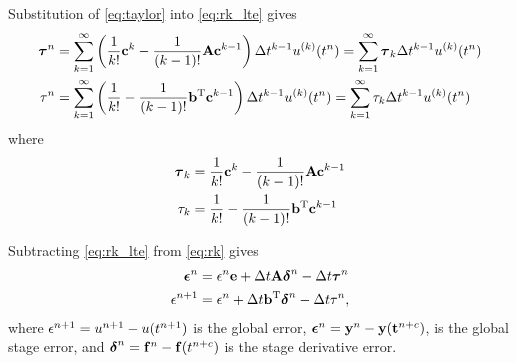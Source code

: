 Substitution of \eqref{eq:taylor} into \eqref{eq:rk_lte} gives
\begin{subequations} \label{eq:ste}
\begin{align}
\boldsymbol{\tau}^n & = \sum_{k=1}^\infty \left( \frac{1}{k!} \mathbf{c}^k - \frac{1}{(k-1)!} \mathbf{A} \mathbf{c}^{k-1}\right) \Delta t^{k-1} u^{(k)}(t^{n}) = \sum_{k=1}^\infty \boldsymbol{\tau}_k \Delta t^{k-1} u^{(k)}(t^{n}) \\
\tau^n & = \sum_{k=1}^\infty \left( \frac{1}{k!} - \frac{1}{(k-1)!} \mathbf{b}^\mathrm{T} \mathbf{c}^{k-1}\right) \Delta t^{k-1} u^{(k)}(t^{n}) = \sum_{k=1}^\infty \tau_k \Delta t^{k-1} u^{(k)}(t^{n})
\end{align}
\end{subequations} 
where 
\begin{subequations} 
\begin{align} \label{eq:ste_coeffs}
\boldsymbol{\tau}_k & = \frac{1}{k!} \mathbf{c}^k - \frac{1}{(k-1)!} \mathbf{A} \mathbf{c}^{k-1} \\
\tau_k & = \frac{1}{k!} - \frac{1}{(k-1)!} \mathbf{b}^\mathrm{T} \mathbf{c}^{k-1}
\end{align}
\end{subequations} 

Subtracting \eqref{eq:rk_lte} from \eqref{eq:rk} gives
\begin{subequations} \label{eq:gserr_series}
\begin{align}
\boldsymbol{\epsilon}^n & = \epsilon^{n} \mathbf{e} + \Delta t \mathbf{A} \boldsymbol{\delta}^n - \Delta t \boldsymbol{\tau}^n \\
\epsilon^{n+1} & = \epsilon^{n} + \Delta t \mathbf{b}^\mathrm{T} \boldsymbol{\delta}^n - \Delta t \tau^n,
\end{align}
\end{subequations}
where $\epsilon^{n+1}=u^{n+1}-u(t^{n+1})$ is the global error,
$\boldsymbol{\epsilon}^n = \mathbf{y}^n-\mathbf{y}(\mathbf{t}^{n+c})$, is the global stage error, and
$\boldsymbol{\delta}^n = \mathbf{f}^n-\mathbf{f}(t^{n+c})$ is the stage derivative error.

